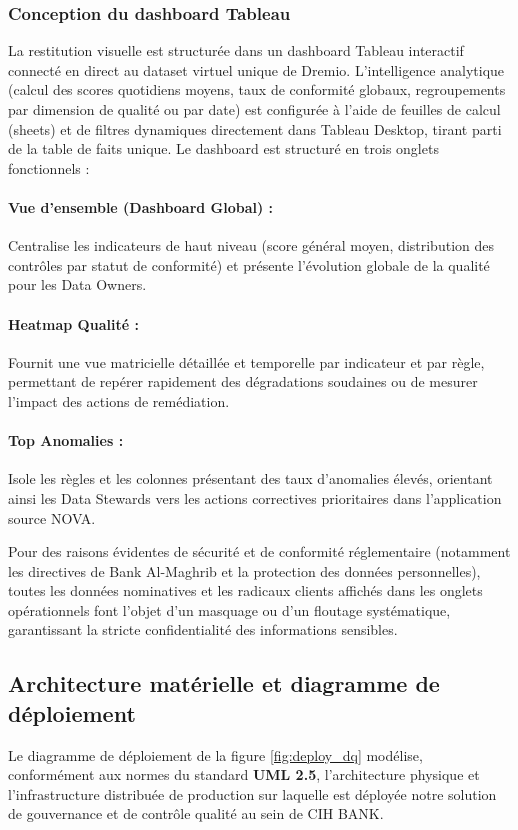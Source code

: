 \subsubsection{Conception du dashboard Tableau}
La restitution visuelle est structurée dans un dashboard Tableau interactif connecté en direct au dataset virtuel unique de Dremio. L'intelligence analytique (calcul des scores quotidiens moyens, taux de conformité globaux, regroupements par dimension de qualité ou par date) est configurée à l'aide de feuilles de calcul (sheets) et de filtres dynamiques directement dans Tableau Desktop, tirant parti de la table de faits unique. Le dashboard est structuré en trois onglets fonctionnels :

\paragraph{Vue d'ensemble (Dashboard Global) :} Centralise les indicateurs de haut niveau (score général moyen, distribution des contrôles par statut de conformité) et présente l'évolution globale de la qualité pour les Data Owners.

\paragraph{Heatmap Qualité :} Fournit une vue matricielle détaillée et temporelle par indicateur et par règle, permettant de repérer rapidement des dégradations soudaines ou de mesurer l'impact des actions de remédiation.

\paragraph{Top Anomalies :} Isole les règles et les colonnes présentant des taux d'anomalies élevés, orientant ainsi les Data Stewards vers les actions correctives prioritaires dans l'application source NOVA.

Pour des raisons évidentes de sécurité et de conformité réglementaire (notamment les directives de Bank Al-Maghrib et la protection des données personnelles), toutes les données nominatives et les radicaux clients affichés dans les onglets opérationnels font l'objet d'un masquage ou d'un floutage systématique, garantissant la stricte confidentialité des informations sensibles.


\subsection{Architecture matérielle et diagramme de déploiement}
Le diagramme de déploiement de la figure \ref{fig:deploy_dq} modélise, conformément aux normes du standard \textbf{UML 2.5}, l'architecture physique et l'infrastructure distribuée de production sur laquelle est déployée notre solution de gouvernance et de contrôle qualité au sein de CIH BANK. 

